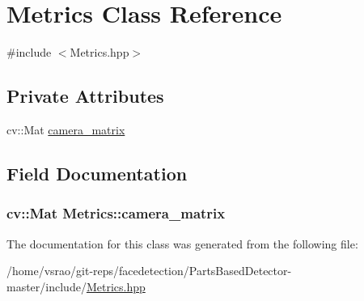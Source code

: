 \hypertarget{classMetrics}{\section{Metrics Class Reference}
\label{classMetrics}
}


{\ttfamily \#include $<$Metrics.\-hpp$>$}

\subsection*{Private Attributes}
\begin{DoxyCompactItemize}
\item 
cv\-::\-Mat \hyperlink{classMetrics_aba72e7e31eb9057d1252e61cdf3aa904}{camera\-\_\-matrix}
\end{DoxyCompactItemize}


\subsection{Field Documentation}
\hypertarget{classMetrics_aba72e7e31eb9057d1252e61cdf3aa904}{
\subsubsection[{camera\-\_\-matrix}]{\setlength{\rightskip}{0pt plus 5cm}cv\-::\-Mat Metrics\-::camera\-\_\-matrix\hspace{0.3cm}{\ttfamily [private]}}}\label{classMetrics_aba72e7e31eb9057d1252e61cdf3aa904}


The documentation for this class was generated from the following file\-:\begin{DoxyCompactItemize}
\item 
/home/vsrao/git-\/reps/facedetection/\-Parts\-Based\-Detector-\/master/include/\hyperlink{Metrics_8hpp}{Metrics.\-hpp}\end{DoxyCompactItemize}
